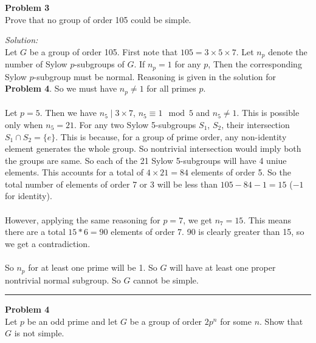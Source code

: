 \documentclass[a4paper, 11pt]{article}
\newenvironment{problem}[2][Problem]
    { \begin{mdframed}[backgroundcolor=gray!20] \textbf{#1 #2} \\}
    {  \end{mdframed}}
\newenvironment{solution}
    {\textit{Solution:}}
    {}
\begin{document}
\begin{problem}{3}
    Prove that no group of order 105 could be simple.
\end{problem}

\begin{solution}\\
    Let $G$ be a group of order 105.
    First note that $105 = 3 \times 5 \times 7$.
    Let $n_p$ denote the number of Sylow $p$-subgroups of $G$.
    If $n_p = 1$ for any $p$, Then the corresponding Sylow $p$-subgroup must be normal.
    Reasoning is given in the solution for \textbf{Problem 4}.
    So we must have $n_p \neq 1$ for all primes $p$.\\\\
    Let $p = 5$.
    Then we have $n_5 \mid 3 \times 7$, $n_5 \equiv 1 \mod{5}$ and $n_5 \neq 1$.
    This is possible only when $n_5 = 21$.
    For any two Sylow 5-subgroups $S_1$, $S_2$, their intersection $S_1 \cap S_2 = \{ e \}$.
    This is because, for a group of prime order, any non-identity element generates the whole group.
    So nontrivial intersection would imply both the groups are same.
    So each of the 21 Sylow 5-subgroups will have 4 uniue elements.
    This accounts for a total of $4 \times 21 = 84$ elements of order 5.
    So the total number of elements of order 7 or 3 will be less than $105 - 84 - 1 = 15$ ($-1$ for identity).\\\\
    However, applying the same reasoning for $p = 7$, we get $n_7 = 15$.
    This means there are a total $15 * 6 = 90$ elements of order 7.
    90 is clearly greater than 15, so we get a contradiction.\\\\
    So $n_p$ for at least one prime will be 1.
    So $G$ will have at least one proper nontrivial normal subgroup.
    So $G$ cannot be simple.
\end{solution} 

\noindent\rule{7in}{2.8pt}


\begin{problem}{4}
    Let $p$ be an odd prime and let $G$ be a group of order $2p^n$ for some $n$.
    Show that $G$ is not simple.
\end{problem}
\end{document}
